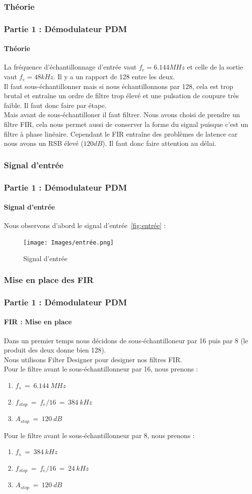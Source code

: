 \documentclass[
10pt,
aspectratio=169,
]{beamer}
\begin{document}
\subsubsection{Théorie}
\begin{frame} 
\frametitle{Partie 1 : Démodulateur PDM} 
\framesubtitle{Théorie} 
La fréquence d'échantillonnage d'entrée vaut $f_e=6.144 MHz$ et celle de la sortie vaut $f_e = 48 kHz$. Il y a un rapport de 128 entre les deux.\\
Il faut sous-échantillonner mais si nous échantillonnons par 128, cela est trop brutal et entraîne un ordre de filtre trop élevé et une pulsation de coupure très faible. Il faut donc faire par étape. \\
Mais avant de sous-échantilloner il faut filtrer. Nous avons choisi de prendre un filtre FIR, cela nous permet aussi de conserver la forme du signal puisque c'est un filtre à phase linéaire. Cependant le FIR entraîne des problèmes de latence car nous avons un RSB élevé ($120 dB$). Il faut donc faire attention au délai.
\end{frame}

\subsubsection{Signal d'entrée}
\begin{frame}
\frametitle{Partie 1 : Démodulateur PDM} 
\framesubtitle{Signal d'entrée} 
Nous observons d'abord le signal d'entrée~\ref{fig:entrée} : 
\begin{figure}[h]
    \centering
    \texttt{[image: Images/entrée.png]}
    \caption{Signal d'entrée}
\end{figure}
\end{frame}

\subsubsection{Mise en place des FIR}
\begin{frame} 
\frametitle{Partie 1 : Démodulateur PDM} 
\framesubtitle{FIR : Mise en place} 
Dans un premier temps nous décidons de sous-échantilloneur par 16 puis par 8 (le produit des deux donne bien 128). \\
Nous utilisons Filter Designer pour designer nos filtres FIR.\\
Pour le filtre avant le sous-échantillonneur par 16, nous prenons : 
\begin{enumerate}
    \item $f_s~=~6.144~MHz$
    \item $f_{stop}~=~f_e/16~=~384~kHz$
    \item $A_{stop}~=~120~dB$
\end{enumerate}
\vspace*{0.7cm}
Pour le filtre avant le sous-échantillonneur par 8, nous prenons : 
\begin{enumerate}
    \item $f_s~=~384~kHz$
    \item $f_{stop}~=~f_e/16~=~24~kHz$
    \item $A_{stop}~=~120~dB$
\end{enumerate}
\end{frame}
\end{document}
